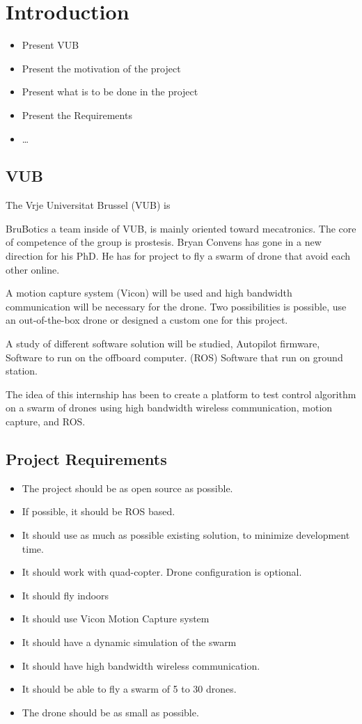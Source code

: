 \chapter{Introduction}

{\color{red}
\begin{itemize}
    \item Present VUB
    \item Present the motivation of the project
    \item Present what is to be done in the project
    \item Present the Requirements
    \item \dots
\end{itemize}
}

\section{VUB}
The {\color{red}Vrje Universitat Brussel} (VUB) is

BruBotics a team inside of VUB, is mainly oriented toward mecatronics. The core of competence of the group is prostesis.
Bryan Convens has gone in a new direction for his PhD.
He has for project to fly a swarm of drone that avoid each other online.


A motion capture system (Vicon) will be used and high bandwidth communication will be necessary for the drone.
Two possibilities is possible, use an out-of-the-box drone or designed a custom one for this project.

A study of different software solution will be studied,
Autopilot firmware,
Software to run on the offboard computer. (ROS)
Software that run on ground station.




The idea of this internship has been to create a platform to test control algorithm on a swarm of drones using high bandwidth wireless communication, motion capture, and ROS.

\section{Project Requirements}
\begin{itemize}
    \item The project should be as open source as possible.
    \item If possible, it should be ROS based.
    \item It should use as much as possible existing solution, to minimize development time.
    \item It should work with quad-copter. Drone configuration is optional.
    \item It should fly indoors
    \item It should use Vicon Motion Capture system
    \item It should have a dynamic simulation of the swarm
    \item It should have high bandwidth wireless communication.
    \item It should be able to fly a swarm of 5 to 30 drones.
    \item The drone should be as small as possible.
\end{itemize}


